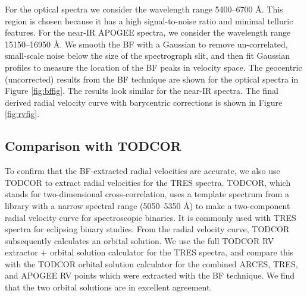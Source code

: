 For the optical spectra we consider the wavelength range 5400--6700 \AA. This region is chosen because it has a high signal-to-noise ratio and minimal telluric features. For the near-IR APOGEE spectra, we consider the wavelength range 15150--16950 \AA. We smooth the BF with a Gaussian to remove un-correlated, small-scale noise below the size of the spectrograph slit, and then fit Gaussian profiles to measure the location of the BF peaks in velocity space. The geocentric (uncorrected) results from the BF technique are shown for the optical spectra in Figure \ref{fig:bffig}. The results look similar for the near-IR spectra. The final derived radial velocity curve with barycentric corrections is shown in Figure \ref{fig:rvfig}.

\subsection{Comparison with TODCOR}\label{todcor}
To confirm that the BF-extracted radial velocities are accurate, we also use TODCOR \citep{zuc94} to extract radial velocities for the TRES spectra. TODCOR, which stands for two-dimensional cross-correlation, uses a template spectrum from a library with a narrow spectral range (5050--5350 \AA) to make a two-component radial velocity curve for spectroscopic binaries. It is commonly used with TRES spectra for eclipsing binary studies. From the radial velocity curve, TODCOR subsequently calculates an orbital solution. We use the full TODCOR RV extractor + orbital solution calculator for the TRES spectra, and compare this with the TODCOR orbital solution calculator for the combined ARCES, TRES, and APOGEE RV points which were extracted with the BF technique. We find that the two orbital solutions are in excellent agreement.
